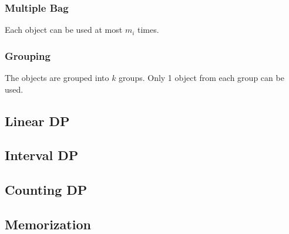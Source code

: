 \documentclass{article}
\begin{document}
\subsubsection{Multiple Bag}

Each object can be used at most $m_i$ times.

\subsubsection{Grouping}

The objects are grouped into $k$ groups. Only 1 object from each group can be used.



\subsection{Linear DP}
\subsection{Interval DP}
\subsection{Counting DP}
\subsection{Memorization}
\end{document}
